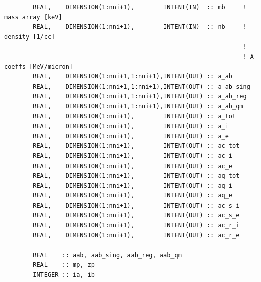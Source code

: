 \documentclass[preprint,12pt,eqsecnum,nofootinbib,amsmath,amssymb]{revtex4}
\begin{document}
{\begin{verbatim}
        REAL,    DIMENSION(1:nni+1),        INTENT(IN)  :: mb     !  mass array [keV]
        REAL,    DIMENSION(1:nni+1),        INTENT(IN)  :: nb     !  density [1/cc]
                                                                  !
                                                                  ! A-coeffs [MeV/micron]
        REAL,    DIMENSION(1:nni+1,1:nni+1),INTENT(OUT) :: a_ab
        REAL,    DIMENSION(1:nni+1,1:nni+1),INTENT(OUT) :: a_ab_sing
        REAL,    DIMENSION(1:nni+1,1:nni+1),INTENT(OUT) :: a_ab_reg
        REAL,    DIMENSION(1:nni+1,1:nni+1),INTENT(OUT) :: a_ab_qm
        REAL,    DIMENSION(1:nni+1),        INTENT(OUT) :: a_tot
        REAL,    DIMENSION(1:nni+1),        INTENT(OUT) :: a_i
        REAL,    DIMENSION(1:nni+1),        INTENT(OUT) :: a_e
        REAL,    DIMENSION(1:nni+1),        INTENT(OUT) :: ac_tot
        REAL,    DIMENSION(1:nni+1),        INTENT(OUT) :: ac_i
        REAL,    DIMENSION(1:nni+1),        INTENT(OUT) :: ac_e
        REAL,    DIMENSION(1:nni+1),        INTENT(OUT) :: aq_tot
        REAL,    DIMENSION(1:nni+1),        INTENT(OUT) :: aq_i
        REAL,    DIMENSION(1:nni+1),        INTENT(OUT) :: aq_e
        REAL,    DIMENSION(1:nni+1),        INTENT(OUT) :: ac_s_i
        REAL,    DIMENSION(1:nni+1),        INTENT(OUT) :: ac_s_e
        REAL,    DIMENSION(1:nni+1),        INTENT(OUT) :: ac_r_i
        REAL,    DIMENSION(1:nni+1),        INTENT(OUT) :: ac_r_e

        REAL    :: aab, aab_sing, aab_reg, aab_qm
        REAL    :: mp, zp
        INTEGER :: ia, ib


\end{verbatim}}
\end{document}
